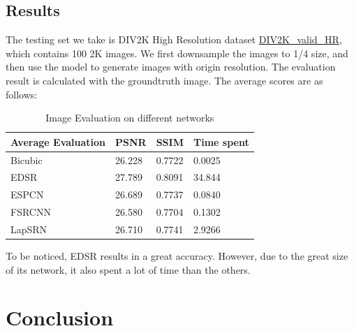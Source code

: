 \documentclass[10pt,twocolumn,letterpaper]{article}
\begin{document}
\subsection{Results}
The testing set we take is DIV2K High Resolution dataset \href{https://data.vision.ee.ethz.ch/cvl/DIV2K}{DIV2K\_valid\_HR}, 
which contains 100 2K images.
We first downsample the images to 1/4 size, and then use the model to generate images with origin resolution.
The evaluation result is calculated with the groundtruth image.
The average scores are as follows:
\begin{table}[H]
    \centering
    \caption{Image Evaluation on different networks}
    \begin{tabular}{|l|l|l|l|}
    \hline
    Average Evaluation  & PSNR   & SSIM   & Time spent  \\ \hline
    Bicubic             & 26.228 & 0.7722 & 0.0025      \\ \hline
    EDSR                & 27.789 & 0.8091 & 34.844      \\ \hline
    ESPCN               & 26.689 & 0.7737 & 0.0840      \\ \hline
    FSRCNN              & 26.580 & 0.7704 & 0.1302      \\ \hline
    LapSRN              & 26.710 & 0.7741 & 2.9266      \\ \hline
    \end{tabular}
\end{table}
To be noticed, EDSR results in a great accuracy. 
However, due to the great size of its network, it also spent a lot of time than the others.

\section{Conclusion}

{\small


}
\end{document}
